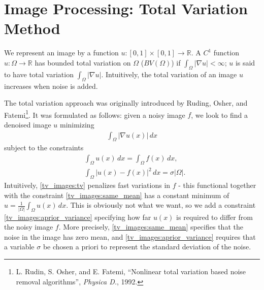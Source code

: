 
\section*{Image Processing: Total Variation Method}
We represent an image by a function $u:[0,1]\times[0,1] \to \mathbb{R}$.
A $C^1$ function $u:\Omega \to \mathbb{R}$ has bounded total variation on $\Omega$ ($BV(\Omega)$) if $\int_{\Omega} |\nabla u| < \infty$; $u$ is said to have total variation $\int_{\Omega} |\nabla u|$.  Intuitively, the total variation of an image $u$ increases when noise is added.

The total variation approach was originally introduced by Ruding, Osher, and Fatemi\footnote{L. Rudin, S. Osher, and E. Fatemi, ``Nonlinear total variation based noise removal algorithms'', \emph{Physica D.}, 1992.}. It was formulated as follows: given a noisy image $f$, we look to find a denoised image $u$ minimizing
\begin{align}
\int_{\Omega} |\nabla u(x)|\, dx \label{tv_images:tv}
\end{align}
subject to the constraints
\begin{align}
    &{ } \int_{\Omega} u(x) \, dx = \int_{\Omega} f(x)\, dx, \label{tv_images:same_mean}\\
    &{ } \int_{\Omega} |u(x) - f(x)|^2\, dx = \sigma |\Omega|.\label{tv_images:aprior_variance}
\end{align}
Intuitively, \eqref{tv_images:tv} penalizes fast variations in $f$ - this functional together with the constraint \eqref{tv_images:same_mean} has a constant minimum of $u = \frac{1}{|\Omega|}\int_{\Omega} u(x) \, dx$. This is obviously not what we want, so we add a constraint \eqref{tv_images:aprior_variance} specifying how far $u(x)$ is required to differ from the noisy image $f$.  More precisely, \eqref{tv_images:same_mean} specifies that the noise in the image has zero mean, and \eqref{tv_images:aprior_variance} requires that a variable $\sigma$ be chosen a priori to represent the standard deviation of the noise.




